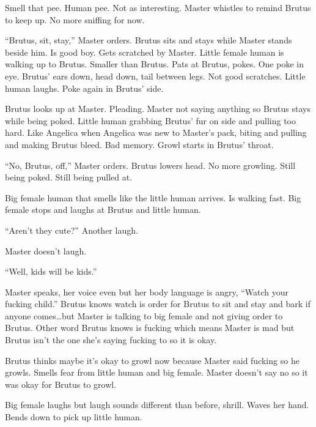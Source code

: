 Smell that pee.  Human pee.  Not as interesting.  Master whistles to remind Brutus to keep up.  No more sniffing for now.



``Brutus, sit, stay,'' Master orders.  Brutus sits and stays while Master stands beside him.  Is good boy.  Gets scratched by Master.  Little female human is walking up to Brutus. Smaller than Brutus.  Pats at Brutus, pokes.  One poke in eye.  Brutus' ears down, head down, tail between legs.  Not good scratches.  Little human laughs.  Poke again in Brutus' side.



Brutus looks up at Master.  Pleading.  Master not saying anything so Brutus stays while being poked.  Little human grabbing Brutus' fur on side and pulling too hard.  Like Angelica when Angelica was new to Master's pack, biting and pulling and making Brutus bleed.  Bad memory.  Growl starts in Brutus' throat.



``No, Brutus, off,'' Master orders.  Brutus lowers head.  No more growling.  Still being poked.  Still being pulled at.



Big female human that smells like the little human arrives.  Is walking fast.  Big female stops and laughs at Brutus and little human.



``Aren't they cute?''  Another laugh.



Master doesn't laugh.



``Well, kids will be kids.''



Master speaks, her voice even but her body language is angry, ``Watch your fucking child.''  Brutus knows watch is order for Brutus to sit and stay and bark if anyone comes\ldots but Master is talking to big female and not giving order to Brutus.  Other word Brutus knows is fucking which means Master is mad but Brutus isn't the one she's saying fucking to so it is okay.



Brutus thinks maybe it's okay to growl now because Master said fucking so he growls.  Smells fear from little human and big female.  Master doesn't say no so it was okay for Brutus to growl.



Big female laughs but laugh sounds different than before, shrill.  Waves her hand.  Bends down to pick up little human.



